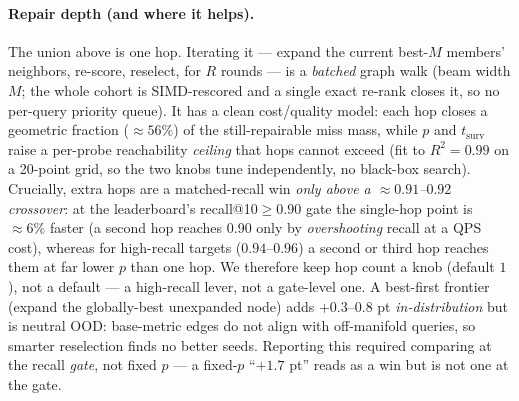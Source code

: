 \documentclass{article}
\begin{document}
\paragraph{Repair depth (and where it helps).} The union above is one hop. Iterating
it --- expand the current best-$M$ members' neighbors, re-score, reselect, for $R$
rounds --- is a \emph{batched} graph walk (beam width $M$; the whole cohort is
SIMD-rescored and a single exact re-rank closes it, so no per-query priority queue).
It has a clean cost/quality model: each hop closes a geometric fraction
($\approx\!56\%$) of the still-repairable miss mass, while $p$ and $t_{\text{surv}}$
raise a per-probe reachability \emph{ceiling} that hops cannot exceed (fit to
$R^2{=}0.99$ on a 20-point grid, so the two knobs tune independently, no black-box
search). Crucially, extra hops are a matched-recall win \emph{only above a
$\approx\!0.91$--$0.92$ crossover}: at the leaderboard's recall@10$\ge\!0.90$ gate the
single-hop point is $\approx\!6\%$ faster (a second hop reaches 0.90 only by
\emph{overshooting} recall at a QPS cost), whereas for high-recall targets
($0.94$--$0.96$) a second or third hop reaches them at far lower $p$ than one hop. We
therefore keep hop count a knob (default $1$), not a default --- a high-recall lever,
not a gate-level one. A best-first frontier (expand the globally-best unexpanded node)
adds $+0.3$--$0.8$ pt \emph{in-distribution} but is neutral OOD: base-metric edges do
not align with off-manifold queries, so smarter reselection finds no better seeds.
Reporting this required comparing at the recall \emph{gate}, not fixed $p$ --- a
fixed-$p$ ``$+1.7$ pt'' reads as a win but is not one at the gate.
\end{document}
